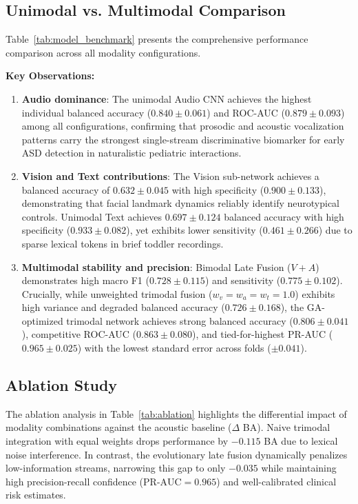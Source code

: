 \documentclass[conference]{IEEEtran}
\begin{document}
\subsection{Unimodal vs. Multimodal Comparison}

Table~\ref{tab:model_benchmark} presents the comprehensive performance comparison across all modality configurations.



\textbf{Key Observations:}
\begin{enumerate}
    \item \textbf{Audio dominance}: The unimodal Audio CNN achieves the highest individual balanced accuracy ($0.840 \pm 0.061$) and ROC-AUC ($0.879 \pm 0.093$) among all configurations, confirming that prosodic and acoustic vocalization patterns carry the strongest single-stream discriminative biomarker for early ASD detection in naturalistic pediatric interactions.

    \item \textbf{Vision and Text contributions}: The Vision sub-network achieves a balanced accuracy of $0.632 \pm 0.045$ with high specificity ($0.900 \pm 0.133$), demonstrating that facial landmark dynamics reliably identify neurotypical controls. Unimodal Text achieves $0.697 \pm 0.124$ balanced accuracy with high specificity ($0.933 \pm 0.082$), yet exhibits lower sensitivity ($0.461 \pm 0.266$) due to sparse lexical tokens in brief toddler recordings.

    \item \textbf{Multimodal stability and precision}: Bimodal Late Fusion ($V+A$) demonstrates high macro F1 ($0.728 \pm 0.115$) and sensitivity ($0.775 \pm 0.102$). Crucially, while unweighted trimodal fusion ($w_v=w_a=w_t=1.0$) exhibits high variance and degraded balanced accuracy ($0.726 \pm 0.168$), the GA-optimized trimodal network achieves strong balanced accuracy ($0.806 \pm 0.041$), competitive ROC-AUC ($0.863 \pm 0.080$), and tied-for-highest PR-AUC ($0.965 \pm 0.025$) with the lowest standard error across folds ($\pm 0.041$).
\end{enumerate}

\subsection{Ablation Study}



The ablation analysis in Table~\ref{tab:ablation} highlights the differential impact of modality combinations against the acoustic baseline ($\Delta$ BA). Naive trimodal integration with equal weights drops performance by $-0.115$ BA due to lexical noise interference. In contrast, the evolutionary late fusion dynamically penalizes low-information streams, narrowing this gap to only $-0.035$ while maintaining high precision-recall confidence ($\text{PR-AUC}=0.965$) and well-calibrated clinical risk estimates.
\end{document}
